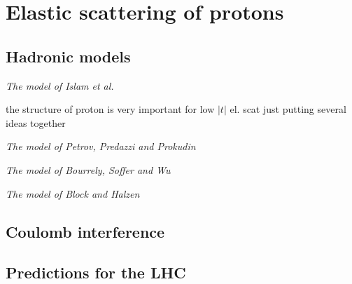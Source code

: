 \chapter{Elastic scattering of protons}

\section{Hadronic models}

\em{The model of Islam et al.}


\> the structure of proton is very important for low $|t|$ el. scat
\> just putting several ideas together

\em{The model of Petrov, Predazzi and Prokudin}


\em{The model of Bourrely, Soffer and Wu}


\em{The model of Block and Halzen}


\section{Coulomb interference}

\section{Predictions for the LHC}

